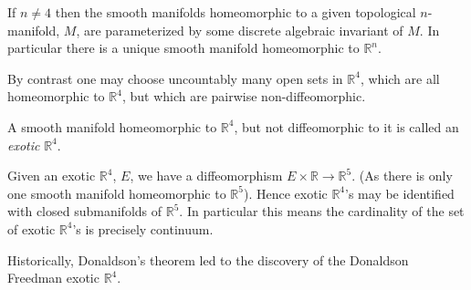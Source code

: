 \documentclass[12pt]{article}
\newcommand {\R} {\mathbb R}
\begin{document}
If $n \neq 4$ then the smooth manifolds homeomorphic to a given topological $n$- manifold, $M$, are parameterized by some discrete algebraic invariant of $M$.  In particular there is a unique smooth manifold homeomorphic to $\R^n$.

\bigskip
By contrast one may choose uncountably many open sets in $\R^4$, which are all homeomorphic to $\R^4$, but which are pairwise non-diffeomorphic.

\bigskip
A smooth manifold homeomorphic to $\R^4$, but not diffeomorphic to it is called an \emph{exotic} $\R^4$.

\bigskip
Given an exotic $\R^4$, $E$, we have a diffeomorphism $E \times \R \to \R^5$.  (As there is only one smooth manifold homeomorphic to $\R^5$).  Hence exotic  $\R^4$'s may be identified with closed submanifolds of $\R^5$.  In particular this means the cardinality of the set of exotic $\R^4$'s is precisely continuum.

\bigskip
Historically, Donaldson's theorem led to the discovery of the Donaldson Freedman exotic $\R^4$.
\end{document}
